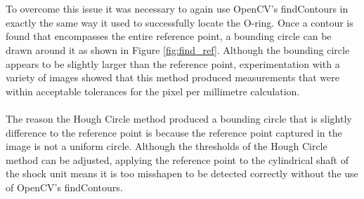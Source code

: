 			\\\\
			To overcome this issue it was necessary to again use OpenCV’s findContours in exactly the same way it used to successfully locate the O-ring. Once a contour is found that encompasses the entire reference point, a bounding circle can be drawn around it as shown in Figure \ref{fig:find_ref}. Although the bounding circle appears to be slightly larger than the reference point, experimentation with a variety of images showed that this method produced measurements that were within acceptable tolerances for the pixel per millimetre calculation.
			\\\\
			The reason the Hough Circle method produced a bounding circle that is slightly difference to the reference point is because the reference point captured in the image is not a uniform circle. Although the thresholds of the Hough Circle method can be adjusted, applying the reference point to the cylindrical shaft of the shock unit means it is too misshapen to be detected correctly without the use of OpenCV’s findContours.
